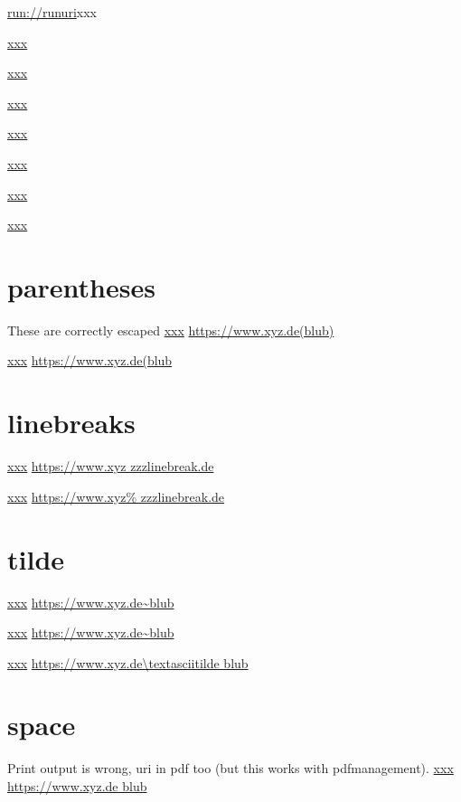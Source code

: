 \documentclass{article}
\begin{document}
\url{run://runuri}{xxx}

\href{:emptyprefixGoToR}{xxx}

\href{file:fileprefixGoToR}{xxx}

\href{run:runprefixLaunch}{xxx}

\href{blub:blubprefixURI}{xxx}

\href{nocolonnodotGoToR}{xxx}

\href{colonURI.dot}{xxx}

\href{colonGoToR.pdf}{xxx}



\section{parentheses}
These are correctly escaped
\href{https://www.xyz.de(blub)}{xxx}
\url{https://www.xyz.de(blub)}

\href{https://www.xyz.de(blub}{xxx}
\url{https://www.xyz.de(blub}



\section{linebreaks}

\href{https://www.xyz
 zzzlinebreak.de}{xxx}
\url{https://www.xyz
zzzlinebreak.de}

\href{https://www.xyz%
zzzlinebreak.de}{xxx}
\url{https://www.xyz%
zzzlinebreak.de}


\section{tilde}
\href{https://www.xyz.de~blub}{xxx}
\url{https://www.xyz.de~blub}

\href{https://www.xyz.de\~blub}{xxx}
\url{https://www.xyz.de\~blub}

\makeatletter
\href{https://www.xyz.de\textasciitilde blub}{xxx}
\url{https://www.xyz.de\textasciitilde blub}
\makeatother


\section{space}
Print output is wrong, uri in pdf too (but this works with pdfmanagement).
\href{https://www.xyz.de blub}{xxx}
\url{https://www.xyz.de blub}
\end{document}
